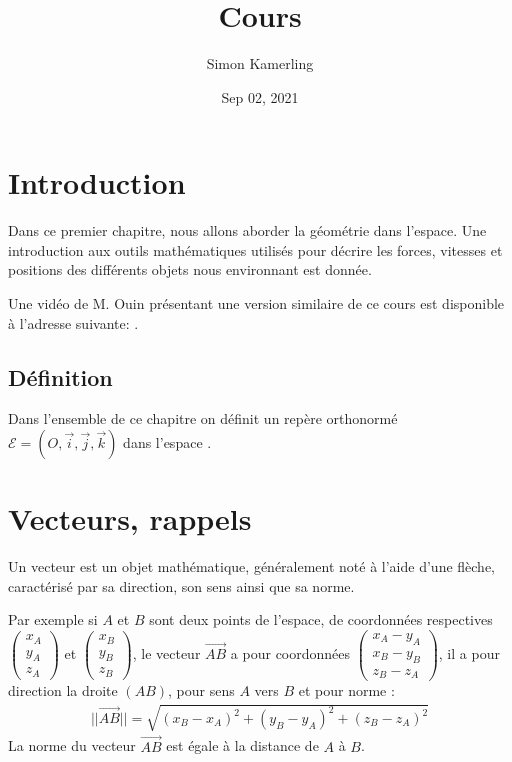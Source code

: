 \documentclass[letterpaper,10pt,english]{jupyterBook}
\title{Cours}
\date{Sep 02, 2021}
\author{Simon Kamerling}
\begin{document}
\pagestyle{empty}
\sphinxmaketitle
\pagestyle{plain}
\sphinxtableofcontents
\pagestyle{normal}
\label{\detokenize{Part1/Cours::doc}}



\chapter{Introduction}
\label{\detokenize{Part1/Cours:introduction}}
\sphinxAtStartPar
Dans ce premier chapitre, nous allons aborder la géométrie dans l’espace. Une introduction aux outils mathématiques utilisés pour décrire les forces, vitesses et positions des différents objets nous environnant est donnée.

\sphinxAtStartPar
Une vidéo de M. Ouin présentant une version similaire de ce cours est disponible à l’adresse suivante:  .


\section{Définition}
\label{\detokenize{Part1/Cours:definition}}
\sphinxAtStartPar
Dans l’ensemble de ce chapitre on définit un repère orthonormé \(\mathcal{E} = (O,\vec{i},\vec{j},\vec{k})\) dans l’espace .


\chapter{Vecteurs, rappels}
\label{\detokenize{Part1/Cours:vecteurs-rappels}}
\sphinxAtStartPar
{} Un vecteur est un objet mathématique, généralement noté à l’aide d’une flèche, caractérisé par sa direction, son sens ainsi que sa norme.

\sphinxAtStartPar
Par exemple si \(A\) et \(B\) sont deux points de l’espace, de coordonnées respectives \(\begin{pmatrix} x_A \\ y_A \\ z_A \end{pmatrix}\) et \(\begin{pmatrix} x_B \\ y_B \\ z_B \end{pmatrix}\), le vecteur \(\vec{AB}\) a pour coordonnées \(\begin{pmatrix}x_A-y_A \\ x_B-y_B \\ z_B-z_A \end{pmatrix}\), il a pour direction la droite \((AB)\), pour sens \(A\) vers \(B\) et pour norme :
\begin{equation*}
\begin{split}
||\vec{AB}|| = \sqrt{(x_B-x_A)^2+(y_B-y_A)^2+(z_B-z_A)^2}
\end{split}
\end{equation*}
\sphinxAtStartPar
La norme du vecteur \(\vec{AB}\) est égale à la distance de \(A\) à \(B\).
\end{document}
